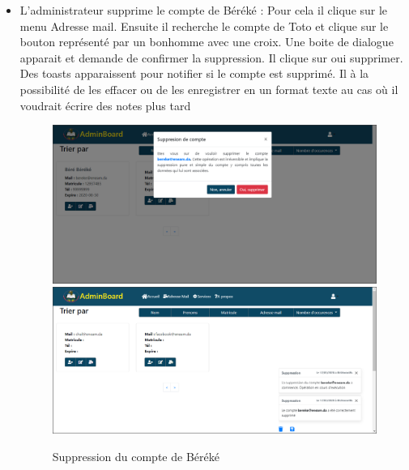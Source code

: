 \documentclass[a4paper,12pt,french]{report} %
\begin{document}
\begin{itemize}
\item L'administrateur supprime le compte de Béréké : Pour cela il clique sur le menu Adresse mail. Ensuite il recherche le compte de Toto et clique sur le bouton représenté par un bonhomme avec une croix. Une boite de dialogue apparait et demande de confirmer la suppression. Il clique sur oui supprimer. Des toasts apparaissent pour notifier si le compte est supprimé. Il à la possibilité de les effacer ou de les enregistrer en un format texte au cas où il voudrait écrire des notes plus tard 
\begin{figure}[H]
\centering
\includegraphics[scale=0.5]{figure/admin_delete_bereke_acount1.png} \\[1cm]
\includegraphics[scale=0.5]{figure/admin_delete_bereke_acount2.png}
\caption{Suppression du compte de Béréké}
\end{figure}  

\end{itemize}
\end{document}
